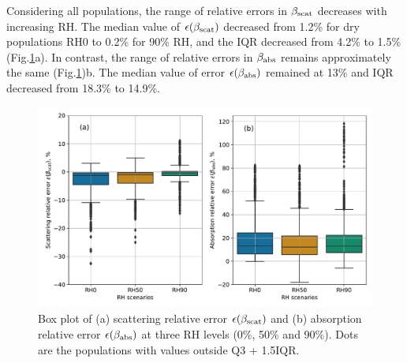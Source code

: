 \documentclass[edeposit,fullpage]{uiucthesis2009}
\begin{document}
Considering all populations, the range of relative errors in
$\beta_{\rm scat}$ decreases with increasing RH. The median value of
$\epsilon(\beta_{\rm scat})$ decreased from 1.2\% for dry populations
RH0 to 0.2\% for 90\% RH, and the IQR decreased from 4.2\% to 1.5\%
(Fig.\ref{fig9:RH90-RH10-opt-scat}a).  In contrast, the range of
relative errors in $\beta_{\rm abs}$ remains approximately the same
(Fig.\ref{fig9:RH90-RH10-opt-scat})b. The median value of error
$\epsilon(\beta_{\rm abs})$ remained at 13\% and IQR decreased from
18.3\% to 14.9\%.
\begin{figure}
	\centering
	\includegraphics[scale=0.5]{chap4_figs/fig8.pdf}
	\caption{Box plot of (a) scattering relative error
          $\epsilon(\beta_{\rm scat})$ and (b) absorption relative
          error $\epsilon(\beta_{\rm abs})$ at three RH levels (0\%,
          50\% and 90\%). Dots are the populations with values outside Q3 + 1.5IQR. }
	\label{fig9:RH90-RH10-opt-scat}
\end{figure}

\end{document}
